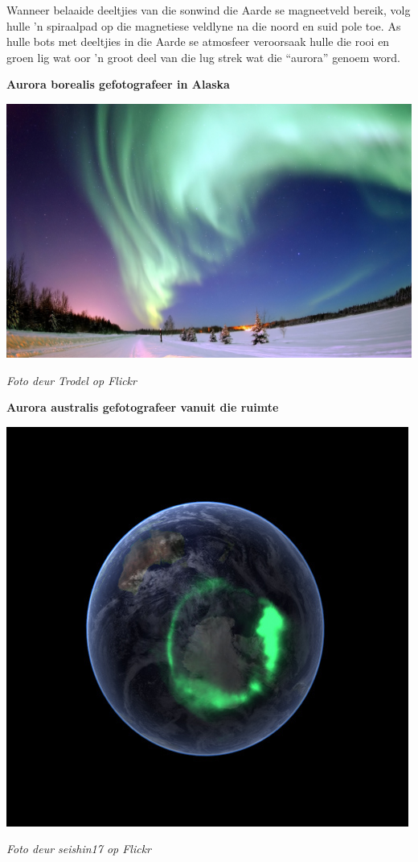 \begin{minipage}{.6\textwidth}
Wanneer belaaide deeltjies van die sonwind die Aarde se magneetveld bereik, volg hulle 'n spiraalpad op die magnetiese veldlyne na die noord en suid pole toe. As hulle bots met deeltjies in die Aarde se atmosfeer veroorsaak hulle die rooi en groen lig wat oor 'n groot deel van die lug strek wat die ``aurora'' genoem word.
\begin{center}
  \textbf{Aurora borealis gefotografeer in Alaska}\par
  \includegraphics[width=.8\textwidth]{photos/aurora_borealis_Trodel.jpg}\par
  \textit{Foto deur Trodel op Flickr}
 \end{center}
\end{minipage}
\begin{minipage}{.4\textwidth}
 \begin{center}
  \textbf{Aurora australis gefotografeer vanuit die ruimte}\par
  \includegraphics[width=.9\textwidth]{photos/aurora_australis_seishin17.jpg}\par
  \textit{Foto deur seishin17 op Flickr}
 \end{center}
\end{minipage}



